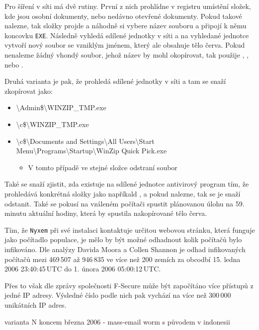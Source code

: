 \documentclass[a4paper,12pt]{article}
\begin{document}
Pro šíření v síti má dvě rutiny. První z nich prohlídne v registru umístění složek, kde jsou osobní dokumenty, nebo nedávno otevřené dokumenty. Pokud takové nalezne, tak složky projde a náhodně si vybere název souboru a připojí k němu koncovku \texttt{EXE}. Následně vyhledá sdílené jednotky v síti a na vyhledané jednotce vytvoří nový soubor se vzniklým jménem, který ale obsahuje tělo červa. Pokud nenalezne žádný vhondý soubor, jehož název by mohl okopírovat, tak použije , , nebo .\cite{nyxem-fsecure}

Druhá varianta je pak, že prohledá sdílené jednotky v síti a tam se snaží zkopírovat jako:
\begin{itemize}
	\item \textbackslash Admin\$\textbackslash WINZIP\_TMP.exe
	\item \textbackslash c\$\textbackslash WINZIP\_TMP.exe
	\item \textbackslash c\$\textbackslash Documents and Settings\textbackslash All Users\textbackslash Start Menu\textbackslash Programs\textbackslash Startup\textbackslash WinZip Quick Pick.exe
	\begin{itemize}
		\item V tomto případě ve stejné složce odstraní soubor 
	\end{itemize}
\end{itemize}
Také se snaží zjistit, zda existuje na sdílené jednotce antivirový program tím, že prohledává konkrétná složky jako napříkald , a pokud nalezne, tak se je snaží odstanit. Také se pokusí na vzáleném počítači spustit plánovanou úlohu na 59. minutu aktuální hodiny, která by spustila nakopírované tělo červa.\cite{nyxem-fsecure}

Tím, že \texttt{Nyxem} při své instalaci kontaktuje určitou webovou stránku, která funguje jako počítadlo populace, je mělo by být možné odhadnout kolik počítačů bylo infikováno. Dle analýzy Davida Moora a Collen Shannon je odhad infikovaných počítačů mezi 469\,507 až 946\,835 ve více než 200 zemích za obcodbí 15. ledna 2006 23:40:45\,UTC do 1. února 2006 05:00:12\,UTC.\cite{nyxem-caida}

Přes to však dle zprávy společnosti F-Secure může být započítáno více přístupů z jedné IP adresy. Výsledné číslo podle nich pak vychází na více než 300\,000 unikátních IP adres.\cite{nyxem-fsecure}


varianta N koncem března 2006 - mass-email worm s původem v indonesii
\end{document}
